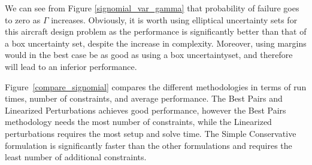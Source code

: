 We can see from Figure \ref{signomial_var_gamma} that probability of failure goes to zero as $\Gamma$ increases. 
Obviously, it is worth using elliptical uncertainty sets for this aircraft design problem as the performance is significantly better than that of a box uncertainty set, despite the increase in complexity. 
Moreover, using margins would in the best case be as good as using a box uncertaintyset, and therefore will lead to an inferior performance.

Figure~\ref{compare_signomial} compares the different methodologies in terms of run times, number of constraints, and average performance. The Best Pairs and Linearized Perturbations achieves good performance, however the Best Pairs methodology needs the most number of constraints, while the Linearized perturbations requires the most setup and solve time. The Simple Conservative formulation is significantly faster than the other formulations and requires the least number of additional constraints.
\ \\
\ \\

